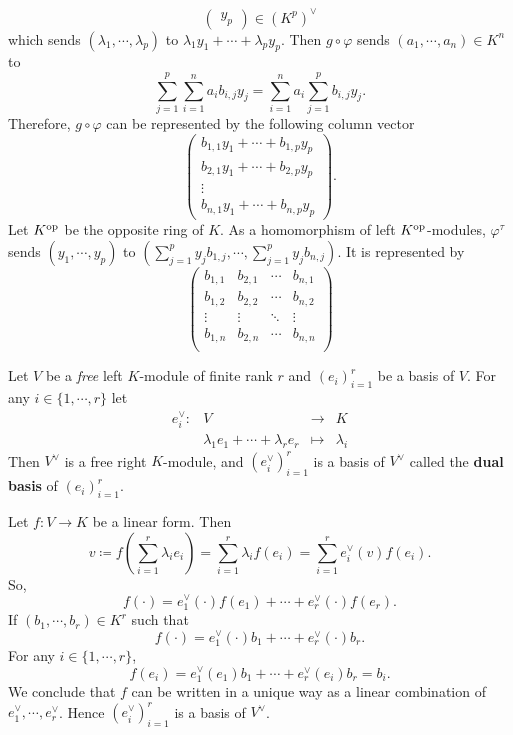 \begin{exampleenv}
$$\begin{pmatrix}
    y_p
\end{pmatrix}
\in \left(K^p\right)^\vee
$$
which sends $\left(\lambda_1,\cdots,\lambda_p\right)$ to $\lambda_1 y_1 + \cdots +\lambda_p y_p$. Then $ g \circ \varphi$ sends $\left(a_1,\cdots, a_n\right)\in K^n$ to 
$$
\sum_{j=1}^{p}\sum_{i=1}^{n} a_i b_{i,j} y_j = \sum_{i=1}^{n}a_i\sum_{j=1}^{p} b_{i,j} y_j.
$$
Therefore, $g\circ \varphi$ can be represented by the following column vector
$$
\begin{pmatrix}
    b_{1,1} y_1 + \cdots + b_{1,p} y_p\\
    b_{2,1} y_1 + \cdots + b_{2,p} y_p\\
    \vdots\\
    b_{n,1} y_1 + \cdots + b_{n,p} y_p
\end{pmatrix}.
$$
Let $K^{\mathrm{op}}$ be the opposite ring of $K$. As a homomorphism of left $K^{\mathrm{op}}$-modules, $\varphi^\tau$ sends $\left(y_1,\cdots, y_p\right)$ to $\left(\sum_{j = 1}^{p} y_j b_{1,j}, \cdots , \sum_{j = 1}^{p} y_j b_{n,j}\right)$. It is represented by 
$$
\begin{pmatrix}
    b_{1,1} & b_{2,1} & \cdots & b_{n,1} \\
    b_{1,2} & b_{2,2} & \cdots & b_{n,2} \\
    \vdots & \vdots & \ddots & \vdots\\
    b_{1,n} & b_{2,n} & \cdots & b_{n,n} \\
\end{pmatrix}
$$
\end{exampleenv}
\begin{propositionenv}
    Let $V$ be a \textit{free} left $K$-module of finite rank $r$ and $\left(e_i\right)_{i=1}^{r}$ be a basis of $V$. For any $i \in \{1,\cdots ,r\}$ let 
    $$ 
    \begin{array}{rccl}
        e_i^\vee : & V & \rightarrow & K\\
        & \lambda_1 e_1 + \cdots + \lambda_r e_r &\mapsto & \lambda_i
    \end{array}
    $$
    Then $V^\vee$ is a free right $K$-module, and 
    $\left(e_i^\vee\right)_{i=1}^{r}$ is a basis of $V^\vee$ called the \textbf{dual basis} of $\left(e_i\right)_{i=1}^{r}$.
\end{propositionenv}
\begin{proofenv}
    Let $f: V\rightarrow K$ be a linear form. Then 
    $$
    v\coloneq f\left(\sum_{i=1}^{r}\lambda_i e_i\right) = \sum_{i=1}^{r}\lambda_i f(e_i)= \sum_{i=1}^{r}e_i^\vee(v) f(e_i).
    $$
    So,
    $$
    f\left(\cdot\right) = e_1^\vee \left(\cdot\right)f(e_1) + \cdots + e_r^\vee \left(\cdot\right) f(e_r).
    $$
    If $\left(b_1,\cdots ,b_r\right) \in K^r$ such that
    $$
    f\left(\cdot\right) = e_1^\vee \left(\cdot\right) b_1 + \cdots + e_r^\vee\left(\cdot\right)b_r.
    $$
    For any $i\in \{1,\cdots ,r\}$,
    $$ f(e_i) = e_1^\vee (e_1) b_1 + \cdots + e_r^\vee (e_i) b_r = b_i.
    $$
    We conclude that $f$ can be written in a unique way as a linear combination of $e_1^\vee,\cdots ,e_r^\vee$. Hence $\left(e_i^\vee\right)_{i=1}^r$ is a basis of $V^\vee$.
\end{proofenv}

